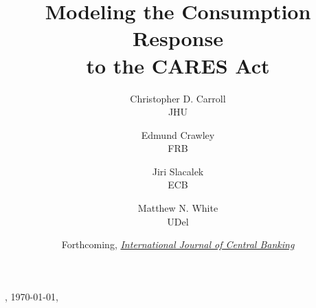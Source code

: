 \documentclass[titlepage,a4paper]{\econtex}
\providecommand{\versn}{}
\renewcommand{\forcedate}{Forthcoming, \href{https://www.ijcb.org/}{\textit{International Journal of Central Banking}}}
\begin{document}
\hfill{\tiny \jobname \versn, \today, \currenttime}

\title{Modeling the Consumption Response\\ to the CARES Act}

{%
  \author{
    Christopher D. Carroll\authNum \\ {\small JHU}
    \and
    Edmund Crawley\authNum   \\ {\small FRB}
    \and
    Jiri Slacalek\authNum    \\ {\small ECB}
    \and
    Matthew N. White\authNum \\ {\small UDel}
  }
} %

  
\date{\forcedate}
\maketitle

\hypertarget{links}{}

\newcommand{\dashtarg}{Live Dashboard}
\newcommand{\htmltarg}{econ-ark.github.io/Pandemic}
\newcommand{\githtarg}{github.com/econ-ark/Pandemic}
\newcommand{\zipftarg}{zip~file:~~root~of~repo}
\newcommand{\latetarg}{LaTeX~directory~in~repo}
\newcommand{\subttarg}{LaTeX~directory~in~repo}

\newcommand{\githrepo}{\href{https://github.com/econ-ark/Pandemic}{\githtarg}}
\newcommand{\githtext}{Full codebase: Modify combos of assumptions}
\newcommand{\zipftext}{contains full replication files (code+text)}
\newcommand{\dashlive}{\href{https://econ-ark.org/materials/pandemic\#dashboard}{\dashtarg}}
\newcommand{\dashtext}{See effect of modifying main assumptions}
\newcommand{\htmlvers}{\href{https://econ-ark.github.io/Pandemic}{\htmltarg}}
\newcommand{\htmltext}{HTML version of paper}
\newcommand{\pdfltsub}{\href{https://github.com/econ-ark/Pandemic/blob/master/LaTeX/ConsumptionResponse.pdf}{\latetarg}}
\newcommand{\pdflttxt}{PDF~version~of~paper}
\newcommand{\slidesub}{\href{https://github.com/econ-ark/Pandemic/blob/master/LaTeX/ConsumptionResponse-Slides.pdf}{\subttarg}}
\newcommand{\slidetxt}{Presentation slides}
\newcommand{\bibtlink}{\href{https://raw.githubusercontent.com/econ-ark/Pandemic/gh-pages/LaTeX/ConsumptionResponse-Self.bib}{\subttarg}}
\newcommand{\bibttext}{Preferred BibTeX citation}
\newcommand{\zipflink}{\href{https://github.com/econ-ark/Pandemic/raw/master/ConsumptionResponse.zip  }{\zipftarg}}
\end{document}
